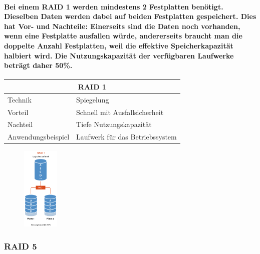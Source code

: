 \documentclass[a4paper]{article}
\begin{document}
    \paragraph{\color{codegreen}Bei einem RAID 1 werden mindestens 2 Festplatten benötigt. Dieselben Daten werden dabei auf beiden Festplatten gespeichert. Dies hat Vor- und Nachteile: Einerseits sind die Daten noch vorhanden, wenn eine Festplatte ausfallen würde, andererseits braucht man die doppelte Anzahl Festplatten, weil die effektive Speicherkapazität halbiert wird. Die Nutzungskapazität der verfügbaren Laufwerke beträgt daher 50\%.\\}
        \begin{vwcol}[widths={0.6,0.4}]
            \begin{tabular}{ll}
                \multicolumn{2}{c}{RAID 1}                                                \\ \hline
                \multicolumn{1}{l|}{Technik}            & Spiegelung                      \\
                \multicolumn{1}{l|}{Vorteil}            & Schnell mit Ausfallsicherheit   \\
                \multicolumn{1}{l|}{Nachteil}           & Tiefe Nutzungskapazität         \\
                \multicolumn{1}{l|}{Anwendungsbeispiel} & Laufwerk für das Betriebssystem
            \end{tabular}
            \begin{figure}[H]
                \includegraphics[height=4cm]{media/raid1}
                \label{fig:raid1}
            \end{figure}
        \end{vwcol}
    \subsubsection{\color{codegreen}RAID 5}
\end{document}
